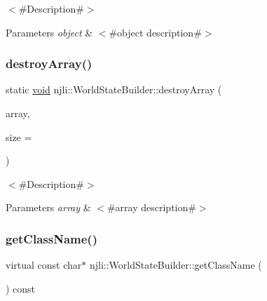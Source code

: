 $<$\#\+Description\#$>$


\begin{DoxyParams}{Parameters}
{\em object} & $<$\#object description\#$>$ \\
\hline
\end{DoxyParams}
\mbox{\label{classnjli_1_1_world_state_builder_a7204d3b1c14985240e80902f4a701412}} 
\subsubsection{\texorpdfstring{destroy\+Array()}{destroyArray()}}
{\footnotesize\ttfamily static \mbox{\hyperlink{_thread_8h_af1e856da2e658414cb2456cb6f7ebc66}{void}} njli\+::\+World\+State\+Builder\+::destroy\+Array (\begin{DoxyParamCaption}\item[{\mbox{\hyperlink{classnjli_1_1_world_state_builder}{World\+State\+Builder}} $\ast$$\ast$}]{array,  }\item[{const \mbox{\hyperlink{_util_8h_a10e94b422ef0c20dcdec20d31a1f5049}{u32}}}]{size = {} }\end{DoxyParamCaption})\hspace{0.3cm}{\ttfamily [static]}}

$<$\#\+Description\#$>$


\begin{DoxyParams}{Parameters}
{\em array} & $<$\#array description\#$>$ \\
\hline
\end{DoxyParams}
\mbox{\label{classnjli_1_1_world_state_builder_abc990ca34261391470dcde9253746cc6}} 
\subsubsection{\texorpdfstring{get\+Class\+Name()}{getClassName()}}
{\footnotesize\ttfamily virtual const char$\ast$ njli\+::\+World\+State\+Builder\+::get\+Class\+Name (\begin{DoxyParamCaption}{ }\end{DoxyParamCaption}) const\hspace{0.3cm}{\ttfamily [virtual]}}

